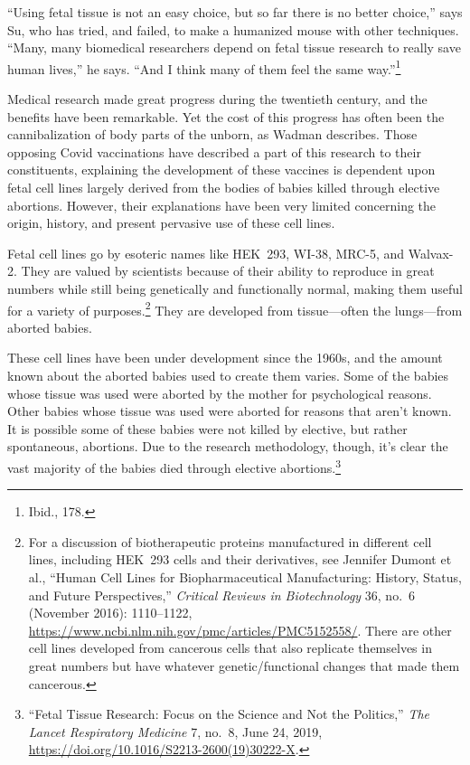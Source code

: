 \documentclass[
]{book}
\begin{document}
``Using fetal tissue is not an easy choice, but so far there is no better choice,'' says Su, who has tried, and failed, to make a humanized mouse with other techniques. ``Many, many biomedical researchers depend on fetal tissue research to really save human lives,'' he says. ``And I think many of them feel the same way.''\footnote{Ibid., 178.}

Medical research made great progress during the twentieth century, and the benefits have been remarkable. Yet the cost of this progress has often been the cannibalization of body parts of the unborn, as Wadman describes. Those opposing Covid vaccinations have described a part of this research to their constituents, explaining the development of these vaccines is dependent upon fetal cell lines largely derived from the bodies of babies killed through elective abortions. However, their explanations have been very limited concerning the origin, history, and present pervasive use of these cell lines.

Fetal cell lines go by esoteric names like HEK~293, WI-38, MRC-5, and Walvax-2. They are valued by scientists because of their ability to reproduce in great numbers while still being genetically and functionally normal, making them useful for a variety of purposes.\footnote{For a discussion of biotherapeutic proteins manufactured in different cell lines, including HEK~293 cells and their derivatives, see Jennifer Dumont et al., ``Human Cell Lines for Biopharmaceutical Manufacturing: History, Status, and Future Perspectives,'' \emph{Critical Reviews in Biotechnology} 36, no.~6 (November 2016): 1110--1122, \url{https://www.ncbi.nlm.nih.gov/pmc/articles/PMC5152558/}. There are other cell lines developed from cancerous cells that also replicate themselves in great numbers but have whatever genetic/functional changes that made them cancerous.} They are developed from tissue---often the lungs---from aborted babies.

These cell lines have been under development since the 1960s, and the amount known about the aborted babies used to create them varies. Some of the babies whose tissue was used were aborted by the mother for psychological reasons. Other babies whose tissue was used were aborted for reasons that aren't known. It is possible some of these babies were not killed by elective, but rather spontaneous, abortions. Due to the research methodology, though, it's clear the vast majority of the babies died through elective abortions.\footnote{``Fetal Tissue Research: Focus on the Science and Not the Politics,'' \emph{The Lancet Respiratory Medicine} 7, no.~8, June 24, 2019, \url{https://doi.org/10.1016/S2213-2600(19)30222-X}.}
\end{document}
